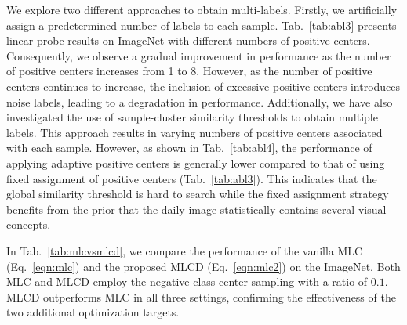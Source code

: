 We explore two different approaches to obtain multi-labels. Firstly, we artificially assign a predetermined number of labels to each sample. Tab.~\ref{tab:abl3} presents linear probe results on ImageNet with different numbers of positive centers. Consequently, we observe a gradual improvement in performance as the number of positive centers increases from 1 to 8. However, as the number of positive centers continues to increase, the inclusion of excessive positive centers introduces noise labels, leading to a degradation in performance.
Additionally, we have also investigated the use of sample-cluster similarity thresholds to obtain multiple labels. This approach results in varying numbers of positive centers associated with each sample. However, as shown in Tab.~\ref{tab:abl4}, the performance of applying adaptive positive centers is generally lower compared to that of using fixed assignment of positive centers (Tab.~\ref{tab:abl3}). This indicates that the global similarity threshold is hard to search while the fixed assignment strategy benefits from the prior that the daily image statistically contains several visual concepts.
 
In Tab.~\ref{tab:mlcvsmlcd}, we compare the performance of the vanilla MLC (Eq.~\ref{eqn:mlc}) and the proposed MLCD (Eq.~\ref{eqn:mlc2}) on the ImageNet. Both MLC and MLCD employ the negative class center sampling with a ratio of $0.1$. MLCD outperforms MLC in all three settings, confirming the effectiveness of the two additional optimization targets. 

\begin{table}[t!]
    \caption{Ablation experiments of the proposed contrastive loss decomposition. Pre-training is executed on the LAION-400M dataset by 32 epochs. The model backbone used here is ViT-B/32. Results are reported on the ImageNet validation dataset.}
    \label{tab:mlcvsmlcd}
    \vspace{-2mm}
    \centering

\end{table}

